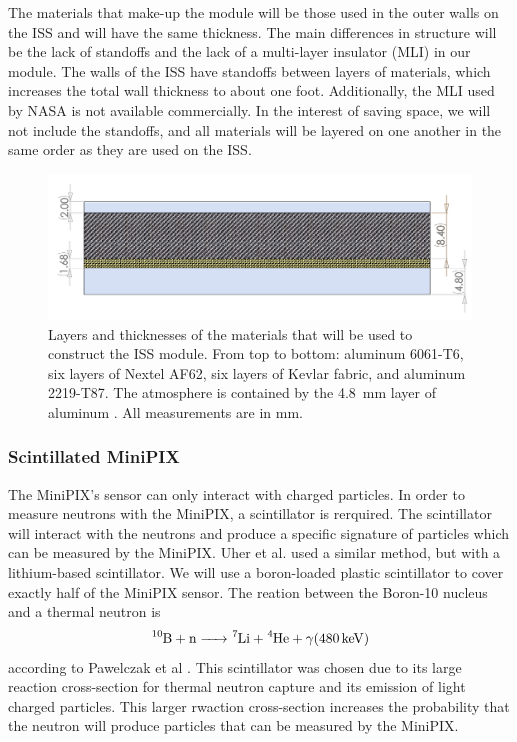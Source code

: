 {The materials that make-up the module will be those used in the outer walls on the ISS and will have the same thickness.
The main differences in structure will be the lack of standoffs and the lack of a multi-layer insulator (MLI) in our module.
The walls of the ISS have standoffs between layers of materials, which increases the total wall thickness to about one foot.
Additionally, the MLI used by NASA is not available commercially.
In the interest of saving space, we will not include the standoffs, and all materials will be layered on one another in the same order as they are used on the ISS.

\begin{figure}[H]
  \centering
  \includegraphics[width=0.8\linewidth]{Figures/MaterialCrossSection.png}
  \caption{Layers and thicknesses of the materials that will be used to construct the ISS module. From top to bottom: aluminum 6061-T6, six layers of Nextel AF62, six layers of Kevlar fabric, and aluminum 2219-T87. The atmosphere is contained by the \SI{4.8}{\milli\meter} layer of aluminum \cite{NASAPP}. All measurements are in \si{\milli\meter}.} 
  \label{fig:ISSLayers}
\end{figure}


\subsubsection{Scintillated MiniPIX}
The MiniPIX's sensor can only interact with charged particles. In order to measure neutrons with the MiniPIX, a scintillator is rerquired. The scintillator will interact with the neutrons and produce a specific signature of particles which can be measured by the MiniPIX. Uher et al. \cite{Uher} used a similar method, but with a lithium-based scintillator. We will use a boron-loaded plastic scintillator \cite{BoronScintillator} to cover exactly half of the MiniPIX sensor. The reation between the Boron-10 nucleus and a thermal neutron is \[\ce{^10B + n -> ^7Li + ^4He + \gamma (\SI{480}{\kilo\eV})}\] according to Pawelczak et al \cite{Pawelczak}. This scintillator was chosen due to its large reaction cross-section for thermal neutron capture and its emission of light charged particles. This larger rwaction cross-section increases the probability that the neutron will produce particles that can be measured by the MiniPIX.

}
